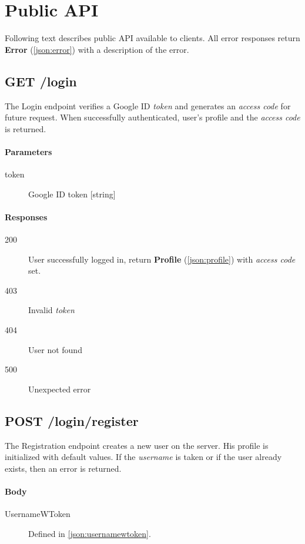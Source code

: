 \section{Public API}
Following text describes public API available to clients. All error responses return \textbf{Error} (\ref{json:error}) with a description of the error.

	\subsection{GET /login}
	The Login endpoint verifies a Google ID \textit{token} and generates an \textit{access code} for future request. When successfully authenticated, user's profile and the \textit{access code} is returned.
		\paragraph*{Parameters}
			\begin{description}
				\item[token] Google ID token [string]
			\end{description}
		\paragraph*{Responses}
			\begin{description}
				\item[200] User successfully logged in, return \textbf{Profile} (\ref{json:profile}) with \textit{access code} set.
				\item[403] Invalid \textit{token}
				\item[404] User not found
				\item[500] Unexpected error
			\end{description}
	
	\subsection{POST /login/register}
	The Registration endpoint creates a new user on the server. His profile is initialized with default values. If the \textit{username} is taken or if the user already exists, then an error is returned.
	
		\paragraph*{Body}
			\begin{description}
				\item[UsernameWToken] Defined in \ref{json:usernamewtoken}.
			\end{description}

